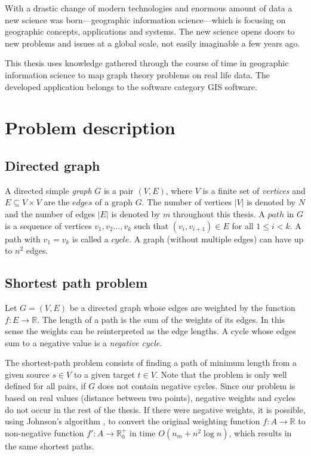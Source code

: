 \documentclass[thesis=M,english]{FITthesis}[2012/10/20]
\begin{document}
With a drastic change of modern technologies and enormous amount of data a new science was born---geographic information science---which is focusing on geographic concepts, applications and systems. The new science opens doors to new problems and issues at a global scale, not easily imaginable a few years ago. 

This thesis uses knowledge gathered through the course of time in geographic information science to map graph theory problems on real life data. The developed application belongs to the software category GIS software. 


\section{Problem description}

\subsection{Directed graph}
A directed simple \textit{graph} $G$ is a pair $(V, E)$, where $V$ is a finite set of \textit{vertices} and $E \subseteq V \times V$ are the $edges$ of a graph $G$. The number of vertices $|V|$ is denoted by $N$ and the number of edges $|E|$ is denoted by $m$ throughout this thesis. A $path$ in $G$ is a sequence of vertices $v_1, v_2 \dots ,v_k$ such that $(v_i,v_{i+1}) \in E$ for all $1 \leq i < k$. A path with $v_1 = v_k$ is called a $cycle$. A graph (without multiple edges) can have up to $n^2$ edges. 


\subsection{Shortest path problem}
\label{sec:SPP}
Let $G = (V, E)$ be a directed graph whose edges are weighted by the function $f: E \to \mathbb{R}$. 
The length of a path is the sum of the weights of its edges. In this sense the weights can be reinterpreted as the edge lengths. A cycle whose edges sum to a negative value is a \textit{negative cycle}.  

The shortest-path problem consists of finding a path of minimum length from a given source $s \in V$ to a given target $t \in V$.
Note that the problem is only well defined for all pairs, if $G$ does not contain negative cycles.
Since our problem is based on real values (distance between two points), negative weights and cycles do not occur in the rest of the thesis.
If there were negative weights, it is possible, using Johnson's algorithm \cite{Johnson77}, to convert the original weighting function $f: A \to \mathbb{R}$ to non-negative function $ f': A \to \mathbb{R}^+_0$ in time $O(n_m + n^2 \log n)$, which results in the same shortest paths.
\end{document}
